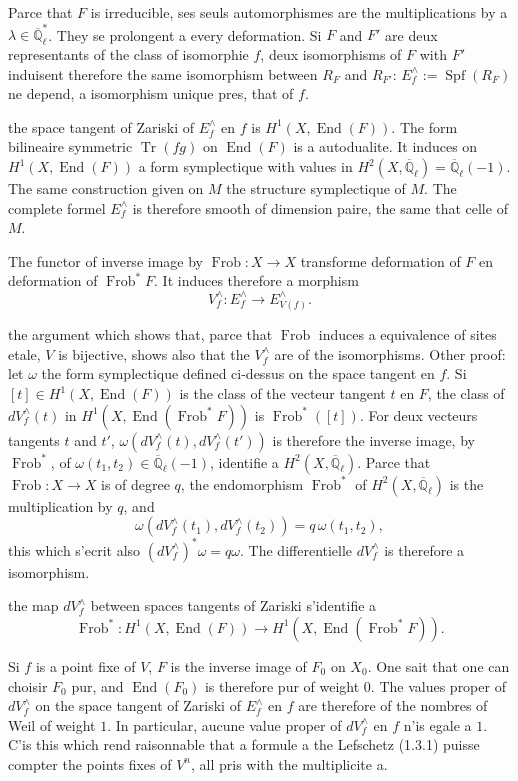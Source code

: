 \documentclass[11pt,a4paper]{article}
\theoremstyle{plain}
\theoremstyle{definition}
\DeclareMathOperator{\Specf}{Spf}
\DeclareMathOperator{\End}{End}
\DeclareMathOperator{\Frob}{Frob}
\DeclareMathOperator{\Tr}{Tr}
\newcommand{\Ql}{\overline{\mathbb{Q}}_\ell}
\begin{document}
Parce that $F$ is irreducible, ses seuls automorphismes are the multiplications by a $\lambda \in \Ql^*$. They se prolongent a every deformation. Si $F$ and $F'$ are deux representants of the class of isomorphie $f$, deux isomorphisms of $F$ with $F'$ induisent therefore the same isomorphism between $R_F$ and $R_{F'}$: $E^\wedge_f := \Specf(R_F)$ ne depend, a isomorphism unique pres, that of $f$.

the space tangent of Zariski of $E^\wedge_f$ en $f$ is $H^1(X, \End(F))$. The form bilineaire symmetric $\Tr(fg)$ on $\End(F)$ is a autodualite. It induces on $H^1(X, \End(F))$ a form symplectique with values in $H^2(X, \Ql) = \Ql(-1)$. The same construction given on $M$ the structure symplectique of $M$. The complete formel $E^\wedge_f$ is therefore smooth of dimension paire, the same that celle of $M$.

The functor of inverse image by $\Frob: X \to X$ transforme deformation of $F$ en deformation of $\Frob^*F$. It induces therefore a morphism
\[
V^\wedge_f: E^\wedge_f \longrightarrow E^\wedge_{V(f)}.
\]

the argument which shows that, parce that $\Frob$ induces a equivalence of sites etale, $V$ is bijective, shows also that the $V^\wedge_f$ are of the isomorphisms. Other proof: let $\omega$ the form symplectique defined ci-dessus on the space tangent en $f$. Si $[t] \in H^1(X, \End(F))$ is the class of the vecteur tangent $t$ en $F$, the class of $dV^\wedge_f(t)$ in $H^1(X, \End(\Frob^*F))$ is $\Frob^*([t])$. For deux vecteurs tangents $t$ and $t'$, $\omega(dV^\wedge_f(t), dV^\wedge_f(t'))$ is therefore the inverse image, by $\Frob^*$, of $\omega(t_1, t_2) \in \Ql(-1)$, identifie a $H^2(X, \Ql)$. Parce that $\Frob: X \to X$ is of degree $q$, the endomorphism $\Frob^*$ of $H^2(X, \Ql)$ is the multiplication by $q$, and
\[
\omega(dV^\wedge_f(t_1), dV^\wedge_f(t_2)) = q\,\omega(t_1, t_2),
\]
this which s'ecrit also $(dV^\wedge_f)^*\omega = q\omega$. The differentielle $dV^\wedge_f$ is therefore a isomorphism.

the map $dV^\wedge_f$ between spaces tangents of Zariski s'identifie a
\[
\Frob^*: H^1(X, \End(F)) \longrightarrow H^1(X, \End(\Frob^*F)).
\]

Si $f$ is a point fixe of $V$, $F$ is the inverse image of $F_0$ on $X_0$. One sait that one can choisir $F_0$ pur, and $\End(F_0)$ is therefore pur of weight $0$. The values proper of $dV^\wedge_f$ on the space tangent of Zariski of $E^\wedge_f$ en $f$ are therefore of the nombres of Weil of weight $1$. In particular, aucune value proper of $dV^\wedge_f$ en $f$ n'is egale a $1$. C'is this which rend raisonnable that a formule a the Lefschetz (1.3.1) puisse compter the points fixes of $V^n$, all pris with the multiplicite a.
\end{document}
